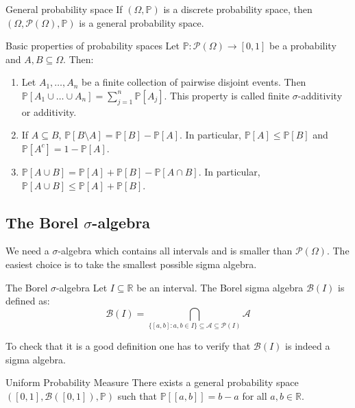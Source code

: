 \documentclass[11pt, a4paper]{article}
\begin{document}
\begin{example}{General probability space}{}
If $(\Omega, \mathbb{P})$ is a discrete probability space, then $(\Omega, \mathcal{P}(\Omega), \mathbb{P})$ is a general probability space.
\end{example}

\begin{proposition}{Basic properties of probability spaces}{}
Let $\mathbb{P}: \mathcal{P}(\Omega) \rightarrow [0,1]$ be a probability and $A, B \subseteq \Omega$. Then:
\begin{enumerate}
    \item Let $A_1, \dots, A_n$ be a finite collection of pairwise disjoint events. Then $\mathbb{P}[A_1 \cup \dots \cup A_n] = \sum_{j=1}^n \mathbb{P}[A_j]$. This property is called finite $\sigma$-additivity or additivity.
    \item If $A \subseteq B$, $\mathbb{P}[B \setminus A] = \mathbb{P}[B] - \mathbb{P}[A]$. In particular, $\mathbb{P}[A] \le \mathbb{P}[B]$ and $\mathbb{P}[A^c] = 1 - \mathbb{P}[A]$.
    \item $\mathbb{P}[A \cup B] = \mathbb{P}[A] + \mathbb{P}[B] - \mathbb{P}[A \cap B]$. In particular, $\mathbb{P}[A \cup B] \le \mathbb{P}[A] + \mathbb{P}[B]$.
\end{enumerate}
\end{proposition}

\subsection{The Borel \texorpdfstring{$\sigma$}{sigma}-algebra}

We need a $\sigma$-algebra which contains all intervals and is smaller than $\mathcal{P}(\Omega)$. The easiest choice is to take the smallest possible sigma algebra.

\begin{definition}{The Borel $\sigma$-algebra}{}
Let $I \subseteq \mathbb{R}$ be an interval. The Borel sigma algebra $\mathcal{B}(I)$ is defined as:
\[\mathcal{B}(I) = \bigcap_{\{[a,b] : a,b \in I\} \subseteq \mathscr{A} \subseteq \mathcal{P}(I)} \mathscr{A}\]

To check that it is a good definition one has to verify that $\mathcal{B}(I)$ is indeed a sigma algebra.
\end{definition}

\begin{theorem}{Uniform Probability Measure}{}
There exists a general probability space $([0, 1], \mathcal{B}([0, 1]), \mathbb{P})$ such that $\mathbb{P}[[a,b]] = b - a$ for all $a, b \in \mathbb{R}$.
\end{theorem}
\end{document}
